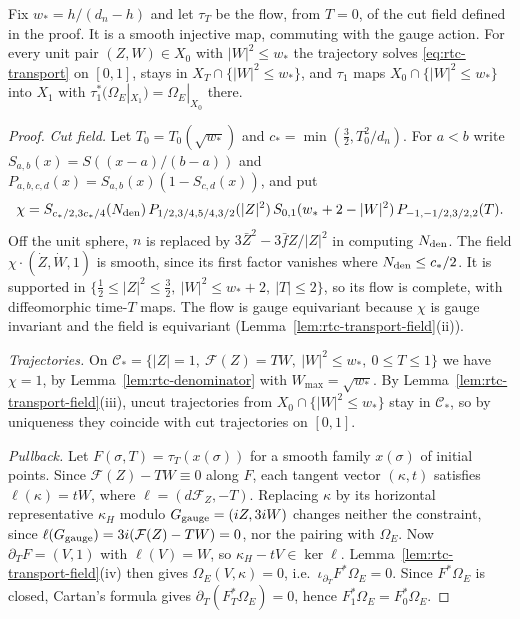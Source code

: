 \begin{proposition}\label{prop:rtc-transport}
Fix $w_*=h/(d_n-h)$ and let $\tau_T$ be the flow, from $T=0$, of the cut field defined in the proof. It is a smooth
injective map, commuting with the gauge action. For every unit pair $(Z,W)\in X_0$ with $|W|^2\le w_*$ the trajectory
solves \eqref{eq:rtc-transport} on $[0,1]$, stays in $X_T\cap\{|W|^2\le w_*\}$, and $\tau_1$ maps
$X_0\cap\{|W|^2\le w_*\}$ into $X_1$ with $\tau_1^*(\Omega_E|_{X_1})=\Omega_E|_{X_0}$ there.
\end{proposition}

\begin{proof}
\emph{Cut field.} Let $T_0=T_0(\sqrt{w_*})$ and $c_*=\min(\frac32,T_0^2/d_n)$. For $a<b$ write $S_{a,b}(x)=S((x-a)/(b-a))$ and $P_{a,b,c,d}(x)=S_{a,b}(x)(1-S_{c,d}(x))$, and put
\[
 \chi=S_{c_*/2,3c_*/4}(N_{\rm den})\,P_{1/2,3/4,5/4,3/2}(|Z|^2)\,S_{0,1}(w_*+2-|W|^2)\,P_{-1,-1/2,3/2,2}(T).
\]
Off the unit sphere, $n$ is replaced by $3\bar Z^2-3\bar fZ/|Z|^2$ in computing $N_{\rm den}$. The field $\chi\cdot(\dot Z,\dot W,1)$ is smooth, since its first factor vanishes where $N_{\rm den}\le c_*/2$. It is supported in $\{\frac12\le|Z|^2\le\frac32,\ |W|^2\le w_*+2,\ |T|\le2\}$, so its flow is complete, with diffeomorphic time-$T$ maps. The flow is gauge equivariant because $\chi$ is gauge invariant and the field is equivariant (Lemma~\ref{lem:rtc-transport-field}(ii)).

\emph{Trajectories.} On $\mathcal C_*=\{|Z|=1,\ \mathcal F(Z)=TW,\ |W|^2\le w_*,\ 0\le T\le1\}$ we have $\chi=1$, by Lemma~\ref{lem:rtc-denominator} with $W_{\max}=\sqrt{w_*}$. By Lemma~\ref{lem:rtc-transport-field}(iii), uncut trajectories from $X_0\cap\{|W|^2\le w_*\}$ stay in $\mathcal C_*$, so by uniqueness they coincide with cut trajectories on $[0,1]$.

\emph{Pullback.} Let $F(\sigma,T)=\tau_T(x(\sigma))$ for a smooth family $x(\sigma)$ of initial points. Since $\mathcal F(Z)-TW\equiv0$ along $F$, each tangent vector $(\kappa,t)$ satisfies $\ell(\kappa)=tW$, where $\ell=(d\mathcal F_Z,-T)$. Replacing $\kappa$ by its horizontal representative $\kappa_H$ modulo $G_{\rm gauge}=(iZ,3iW)$ changes neither the constraint, since $\ell(G_{\rm gauge})=3i(\mathcal F(Z)-TW)=0$, nor the pairing with $\Omega_E$. Now $\partial_TF=(V,1)$ with $\ell(V)=W$, so $\kappa_H-tV\in\ker\ell$. Lemma~\ref{lem:rtc-transport-field}(iv) then gives $\Omega_E(V,\kappa)=0$, i.e.\ $\iota_{\partial_T}F^*\Omega_E=0$. Since $F^*\Omega_E$ is closed, Cartan's formula gives $\partial_T(F_T^*\Omega_E)=0$, hence $F_1^*\Omega_E=F_0^*\Omega_E$.
\end{proof}

